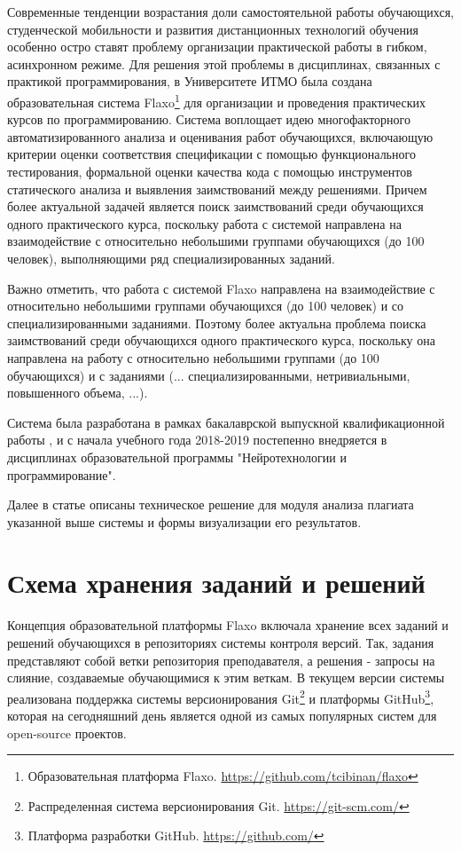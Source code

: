\documentclass[a4paper,14pt]{extarticle}
\begin{document}
Современные тенденции возрастания доли самостоятельной работы обучающихся, студенческой мобильности и развития дистанционных технологий обучения особенно остро ставят проблему организации практической работы в гибком, асинхронном режиме. Для решения этой проблемы в дисциплинах, связанных с практикой программирования, в Университете ИТМО была создана образовательная система Flaxo\footnote{Образовательная платформа Flaxo. \url{https://github.com/tcibinan/flaxo}} для организации и проведения практических курсов по программированию. Система воплощает идею многофакторного автоматизированного анализа и оценивания работ обучающихся, включающую критерии оценки соответствия спецификации с помощью функционального тестирования, формальной оценки качества кода с помощью инструментов статического анализа и выявления заимствований между решениями. Причем более актуальной задачей является поиск заимствований среди обучающихся одного практического курса, поскольку работа с системой направлена на взаимодействие с относительно небольшими группами обучающихся (до 100 человек), выполняющими ряд специализированных заданий.

Важно отметить, что работа с системой Flaxo направлена на взаимодействие с относительно небольшими группами обучающихся (до 100 человек) и со специализированными заданиями. Поэтому   более актуальна проблема поиска заимствований среди обучающихся одного практического курса, поскольку она направлена на работу с относительно небольшими группами (до 100 обучающихся) и с заданиями (... специализированными, нетривиальными, повышенного объема, ...).

Система была разработана в рамках бакалаврской выпускной квалификационной работы \citep{flaxoThesis}\citep{flaxoKmu}, и с начала учебного года 2018-2019 постепенно внедряется в дисциплинах образовательной программы "Нейротехнологии и программирование".

Далее в статье описаны техническое решение для модуля анализа плагиата указанной выше системы и формы визуализации его результатов.

\section{Схема хранения заданий и решений}

Концепция образовательной платформы Flaxo включала хранение всех заданий и решений обучающихся в репозиториях системы контроля версий. Так, задания представляют собой ветки репозитория преподавателя, а решения - запросы на слияние, создаваемые обучающимися к этим веткам. В текущем версии системы реализована поддержка системы версионирования Git\footnote{Распределенная система версионирования Git. \url{https://git-scm.com/}} и платформы GitHub\footnote{Платформа разработки GitHub. \url{https://github.com/}}, которая на сегодняшний день является одной из самых популярных систем для open-source проектов.
\end{document}
